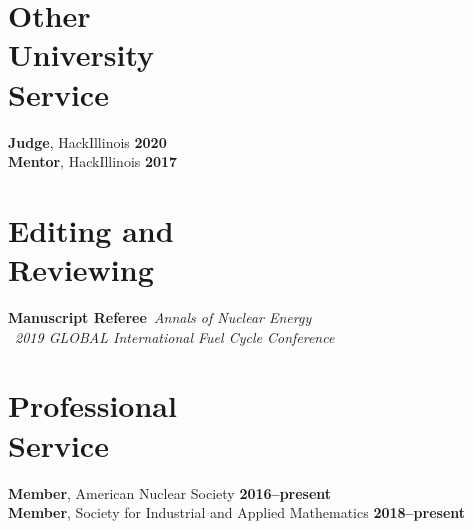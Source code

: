 \documentclass[margin,line]{resume}
\begin{document}
\begin{resume}
    \section{\mysidestyle Other\\University\\Service}
		\textbf{Judge}, HackIllinois \hfill \textbf{2020}\vspace{.5mm}\\%
		\textbf{Mentor}, HackIllinois \hfill 
		\textbf{2017}\vspace{.5mm}\\%

\section{\mysidestyle Editing and\\Reviewing}
    \textbf{Manuscript Referee}~\hfill \emph{Annals of Nuclear Energy}\\%
						\mbox{}~\hfill \emph{2019 GLOBAL International Fuel 
    Cycle Conference}\\%
\section{\mysidestyle Professional\\Service}
\textbf{Member}, American Nuclear Society  \hfill 
\textbf{2016--present}\vspace{.5mm}\\
\textbf{Member}, Society for Industrial and Applied Mathematics  \hfill 
\textbf{2018--present}\vspace{.5mm}\\%

\end{resume}
\end{document}
